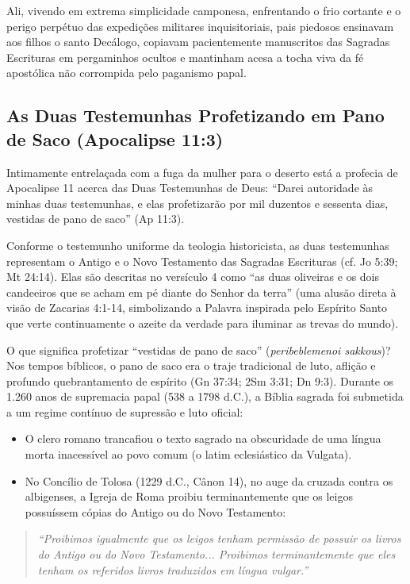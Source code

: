 \documentclass[11pt,a4paper,openany]{book}
\begin{document}
Ali, vivendo em extrema simplicidade camponesa, enfrentando o frio cortante e o perigo perpétuo das expedições militares inquisitoriais, pais piedosos ensinavam aos filhos o santo Decálogo, copiavam pacientemente manuscritos das Sagradas Escrituras em pergaminhos ocultos e mantinham acesa a tocha viva da fé apostólica não corrompida pelo paganismo papal.



\subsection{As Duas Testemunhas Profetizando em Pano de Saco (Apocalipse 11:3)}


Intimamente entrelaçada com a fuga da mulher para o deserto está a profecia de Apocalipse 11 acerca das Duas Testemunhas de Deus: ``Darei autoridade às minhas duas testemunhas, e elas profetizarão por mil duzentos e sessenta dias, vestidas de pano de saco'' (Ap 11:3).

Conforme o testemunho uniforme da teologia historicista, as duas testemunhas representam o Antigo e o Novo Testamento das Sagradas Escrituras (cf. Jo 5:39; Mt 24:14). Elas são descritas no versículo 4 como ``as duas oliveiras e os dois candeeiros que se acham em pé diante do Senhor da terra'' (uma alusão direta à visão de Zacarias 4:1-14, simbolizando a Palavra inspirada pelo Espírito Santo que verte continuamente o azeite da verdade para iluminar as trevas do mundo).

O que significa profetizar ``vestidas de pano de saco'' (\textit{peribeblemenoi sakkous})? Nos tempos bíblicos, o pano de saco era o traje tradicional de luto, aflição e profundo quebrantamento de espírito (Gn 37:34; 2Sm 3:31; Dn 9:3). Durante os 1.260 anos de supremacia papal (538 a 1798 d.C.), a Bíblia sagrada foi submetida a um regime contínuo de supressão e luto oficial:
\begin{itemize}
  \item O clero romano trancafiou o texto sagrado na obscuridade de uma língua morta inacessível ao povo comum (o latim eclesiástico da Vulgata).
  \item No Concílio de Tolosa (1229 d.C., Cânon 14), no auge da cruzada contra os albigenses, a Igreja de Roma proibiu terminantemente que os leigos possuíssem cópias do Antigo ou do Novo Testamento:
\end{itemize}


\begin{quote}
\itshape \textit{``Proibimos igualmente que os leigos tenham permissão de possuir os livros do Antigo ou do Novo Testamento... Proibimos terminantemente que eles tenham os referidos livros traduzidos em língua vulgar.''}
\end{quote}
\end{document}
